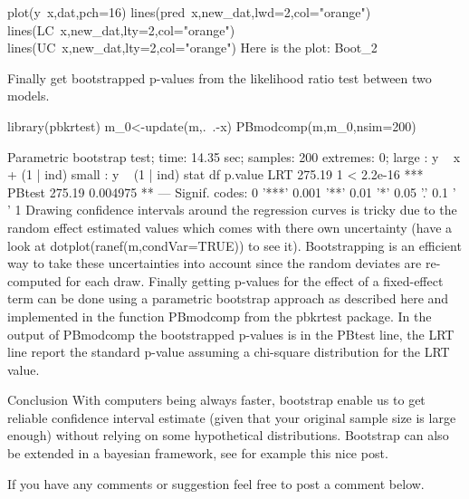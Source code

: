 plot(y~x,dat,pch=16)
lines(pred~x,new_dat,lwd=2,col="orange")
lines(LC~x,new_dat,lty=2,col="orange")
lines(UC~x,new_dat,lty=2,col="orange")
Here is the plot:
Boot_2

Finally get bootstrapped p-values from the likelihood ratio test between two models.

library(pbkrtest)
m_0<-update(m,.~.-x)
PBmodcomp(m,m_0,nsim=200)

Parametric bootstrap test; time: 14.35 sec; samples: 200 extremes: 0;
large : y ~ x + (1 | ind)
small : y ~ (1 | ind)
       stat df   p.value    
LRT    275.19  1 < 2.2e-16 ***
PBtest 275.19     0.004975 ** 
---
Signif. codes:  0 '***' 0.001 '**' 0.01 '*' 0.05 '.' 0.1 ' ' 1
Drawing confidence intervals around the regression curves is tricky due to the random effect estimated values which comes with there own uncertainty (have a look at dotplot(ranef(m,condVar=TRUE)) to see it). Bootstrapping is an efficient way to take these uncertainties into account since the random deviates are re-computed for each draw. Finally getting p-values for the effect of a fixed-effect term can be done using a parametric bootstrap approach as described here and implemented in the function PBmodcomp from the pbkrtest package. In the output of PBmodcomp the bootstrapped p-values is in the PBtest line, the LRT line report the standard p-value assuming a chi-square distribution for the LRT value.

Conclusion
With computers being always faster, bootstrap enable us to get reliable confidence interval estimate (given that your original sample size is large enough) without relying on some hypothetical distributions. Bootstrap can also be extended in a bayesian framework, see for example this nice post.

If you have any comments or suggestion feel free to post a comment below.
